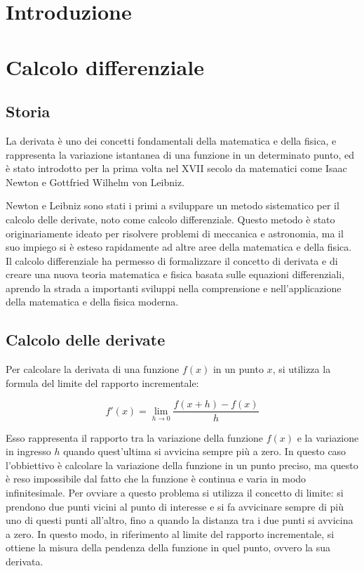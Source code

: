 \documentclass{article}
\begin{document}
\renewcommand{\contentsname}{Sommario}
\tableofcontents

\newpage

\section{Introduzione}

\newpage

\section{Calcolo differenziale}

\subsection{Storia}

La derivata è uno dei concetti fondamentali della matematica e della fisica, e rappresenta la variazione istantanea di una funzione in un determinato punto, ed è stato introdotto per la prima volta nel XVII secolo da matematici come Isaac Newton e Gottfried Wilhelm von Leibniz.

Newton e Leibniz sono stati i primi a sviluppare un metodo sistematico per il calcolo delle derivate, noto come calcolo differenziale. Questo metodo è stato originariamente ideato per risolvere problemi di meccanica e astronomia, ma il suo impiego si è esteso rapidamente ad altre aree della matematica e della fisica. Il calcolo differenziale ha permesso di formalizzare il concetto di derivata e di creare una nuova teoria matematica e fisica basata sulle equazioni differenziali, aprendo la strada a importanti sviluppi nella comprensione e nell'applicazione della matematica e della fisica moderna.

\subsection{Calcolo delle derivate}

Per calcolare la derivata di una funzione $f(x)$ in un punto $x$, si utilizza la formula del limite del rapporto incrementale:

\[ f'(x) = \lim\limits_{h \to 0} \dfrac{f(x + h) - f(x)}{h} \tag{2.2.1}\label{eq:limite_del_rapporto_incrementale} \]

Esso rappresenta il rapporto tra la variazione della funzione $f(x)$ e la variazione in ingresso $h$ quando quest'ultima si avvicina sempre più a zero. In questo caso l'obbiettivo è calcolare la variazione della funzione in un punto preciso, ma questo è reso impossibile dal fatto che la funzione è continua e varia in modo infinitesimale. Per ovviare a questo problema si utilizza il concetto di limite: si prendono due punti vicini al punto di interesse e si fa avvicinare sempre di più uno di questi punti all'altro, fino a quando la distanza tra i due punti si avvicina a zero. In questo modo, in riferimento al limite del rapporto incrementale, si ottiene la misura della pendenza della funzione in quel punto, ovvero la sua derivata.
\end{document}
